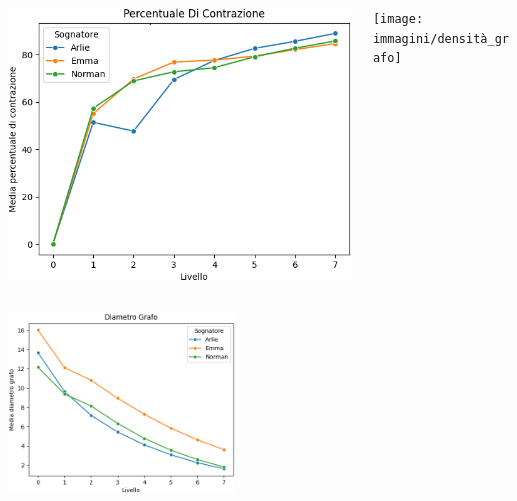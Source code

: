 \begin{minipage}[t]{\textwidth}
    \begin{columns}
    \begin{column}{0.45\textwidth}
        \includegraphics[width=\textwidth]{immagini/percentuale_di_contrazione}
    \end{column}
    \begin{column}{0.45\textwidth}
        \texttt{[image: immagini/densità\_grafo]}
    \end{column}
    \end{columns}
    \end{minipage}
\begin{minipage}[t]{\textwidth}
    \vspace{-0.1cm}
    \centering
    \includegraphics[width=0.45\textwidth]{immagini/diametro_grafo}
\end{minipage}